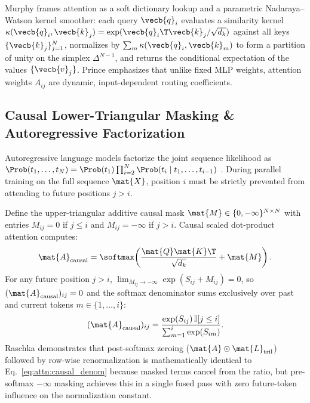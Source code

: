 \documentclass[../../../../master.tex]{subfiles}
\begin{document}
\begin{intuition}
Murphy  frames attention as a soft dictionary lookup and a parametric Nadaraya--Watson kernel smoother: each query $\vecb{q}_i$ evaluates a similarity kernel $\kappa(\vecb{q}_i, \vecb{k}_j) = \exp(\vecb{q}_i\T \vecb{k}_j / \sqrt{d_k})$ against all keys $\{\vecb{k}_j\}_{j=1}^N$, normalizes by $\sum_m \kappa(\vecb{q}_i, \vecb{k}_m)$ to form a partition of unity on the simplex $\Delta^{N-1}$, and returns the conditional expectation of the values $\{\vecb{v}_j\}$. Prince  emphasizes that unlike fixed MLP weights, attention weights $A_{ij}$ are dynamic, input-dependent routing coefficients.
\end{intuition}

\subsection{Causal Lower-Triangular Masking \& Autoregressive Factorization}

Autoregressive language models factorize the joint sequence likelihood as $\Prob(t_1, \dots, t_N) = \Prob(t_1)\prod_{i=2}^N \Prob(t_i \mid t_1, \dots, t_{i-1})$ . During parallel training on the full sequence $\mat{X}$, position $i$ must be strictly prevented from attending to future positions $j > i$.

\begin{coremath}
Define the upper-triangular additive causal mask $\mat{M} \in \{0, -\infty\}^{N \times N}$ with entries $M_{ij} = 0$ if $j \le i$ and $M_{ij} = -\infty$ if $j > i$. Causal scaled dot-product attention computes:
\begin{equation}
  \mat{A}_{\mathrm{causal}} = \softmax\!\left(\frac{\mat{Q}\mat{K}\T}{\sqrt{d_k}} + \mat{M}\right).
  \label{eq:attn:causal_mask}
\end{equation}
For any future position $j > i$, $\lim_{M_{ij} \to -\infty} \exp(S_{ij} + M_{ij}) = 0$, so $(\mat{A}_{\mathrm{causal}})_{ij} = 0$ and the softmax denominator sums exclusively over past and current tokens $m \in \{1, \dots, i\}$:
\begin{equation}
  (\mat{A}_{\mathrm{causal}})_{ij} = \frac{\exp(S_{ij})\,\mathbb{I}[j \le i]}{\sum_{m=1}^{i} \exp(S_{im})}.
  \label{eq:attn:causal_denom}
\end{equation}
Raschka  demonstrates that post-softmax zeroing ($\mat{A} \odot \mat{L}_{\mathrm{tril}}$) followed by row-wise renormalization is mathematically identical to Eq.~\eqref{eq:attn:causal_denom} because masked terms cancel from the ratio, but pre-softmax $-\infty$ masking achieves this in a single fused pass with zero future-token influence on the normalization constant.
\end{coremath}
\end{document}
